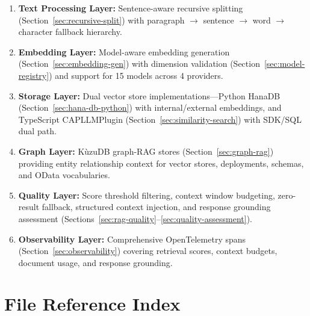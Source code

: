 \documentclass[11pt]{article}
\begin{document}
\begin{enumerate}
  \item \textbf{Text Processing Layer:} Sentence-aware recursive splitting
        (Section~\ref{sec:recursive-split}) with paragraph $\to$ sentence $\to$
        word $\to$ character fallback hierarchy.

  \item \textbf{Embedding Layer:} Model-aware embedding generation
        (Section~\ref{sec:embedding-gen}) with dimension validation
        (Section~\ref{sec:model-registry}) and support for 15 models across
        4 providers.

  \item \textbf{Storage Layer:} Dual vector store implementations---Python
        HanaDB (Section~\ref{sec:hana-db-python}) with internal/external
        embeddings, and TypeScript CAPLLMPlugin
        (Section~\ref{sec:similarity-search}) with SDK/SQL dual path.

  \item \textbf{Graph Layer:} KùzuDB graph-RAG stores
        (Section~\ref{sec:graph-rag}) providing entity relationship context
        for vector stores, deployments, schemas, and OData vocabularies.

  \item \textbf{Quality Layer:} Score threshold filtering, context window
        budgeting, zero-result fallback, structured context injection,
        and response grounding assessment
        (Sections~\ref{sec:rag-quality}--\ref{sec:quality-assessment}).

  \item \textbf{Observability Layer:} Comprehensive OpenTelemetry spans
        (Section~\ref{sec:observability}) covering retrieval scores, context
        budgets, document usage, and response grounding.
\end{enumerate}

\section{File Reference Index}
\label{sec:file-index}
\end{document}
